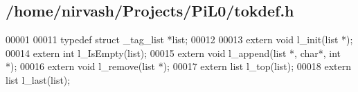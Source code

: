 \subsection{/home/nirvash/\-Projects/\-Pi\-L0/tokdef.h}

\begin{DoxyCode}
00001 
00011 \textcolor{keyword}{typedef} \textcolor{keyword}{struct }_tag_list *list;
00012 
00013 \textcolor{keyword}{extern} \textcolor{keywordtype}{void} l_init(list *);
00014 \textcolor{keyword}{extern} \textcolor{keywordtype}{int} l_IsEmpty(list);
00015 \textcolor{keyword}{extern} \textcolor{keywordtype}{void} l_append(list *, \textcolor{keywordtype}{char}*, \textcolor{keywordtype}{int} *);
00016 \textcolor{keyword}{extern} \textcolor{keywordtype}{void} l_remove(list *);
00017 \textcolor{keyword}{extern} list l_top(list);
00018 \textcolor{keyword}{extern} list l_last(list);
\end{DoxyCode}
